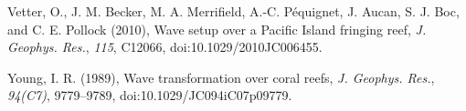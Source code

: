 \documentclass[default,jgrga]{agutex2015}
\begin{document}
\begin{article}
\begin{thebibliography}{}
Vetter, O., J. M. Becker, M. A. Merrifield, A.-C. P\'equignet, J. Aucan, S. J. Boc, and C. E. Pollock (2010), Wave setup over a Pacific Island fringing reef, \textit{J. Geophys. Res.}, \textit{115}, C12066, doi:10.1029/2010JC006455.

Young, I. R. (1989), Wave transformation over coral reefs, \textit{J. Geophys. Res.}, \textit{94(C7)}, 9779--9789, doi:10.1029/JC094iC07p09779.


%
%
%
%

\end{thebibliography}



%

%
%
\end{article}
\end{document}
